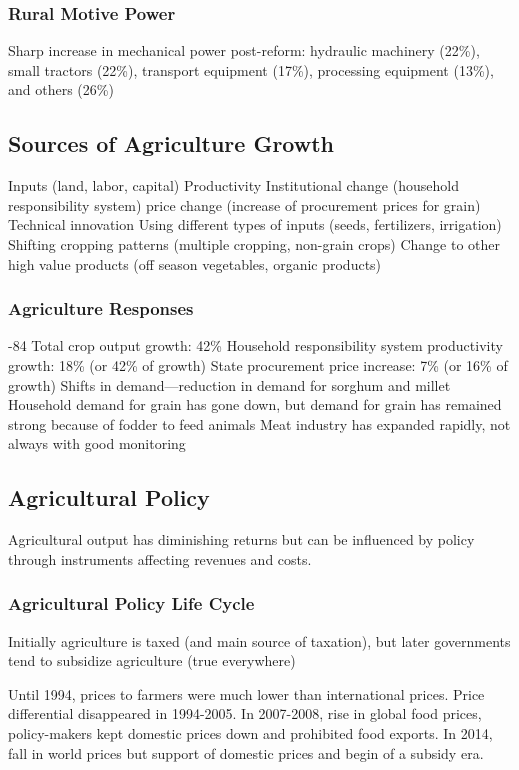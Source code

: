 \documentclass[11pt]{article}
\theoremstyle{definition}
\theoremstyle{remark}
\begin{document}
\subsubsection{Rural Motive Power}
Sharp increase in mechanical power post-reform: hydraulic machinery (22\%), small tractors (22\%), transport equipment (17\%), processing equipment (13\%), and others (26\%)

\subsection{Sources of Agriculture Growth}
\begin{outline}[enumerate]
\1 Inputs (land, labor, capital)
\1 Productivity
	\2 Institutional change (household responsibility system)
	\2 price change (increase of procurement prices for grain)
	\2 Technical innovation
		\3 Using different types of inputs (seeds, fertilizers, irrigation)
		\3 Shifting cropping patterns (multiple cropping, non-grain crops)
		\3 Change to other high value products (off season vegetables, organic products)
\end{outline}

\subsubsection{Agriculture Responses}
\begin{outline}[enumerate]
-84
	\2 Total crop output growth: 42\%
	\2 Household responsibility system productivity growth: 18\% (or 42\% of growth)
	\2 State procurement price increase: 7\% (or 16\% of growth)
\1 Shifts in demand---reduction in demand for sorghum and millet
	\2 Household demand for grain has gone down, but demand for grain has remained strong because of fodder to feed animals
	\2  Meat industry has expanded rapidly, not always with good monitoring
\end{outline}

\subsection{Agricultural Policy}
Agricultural output has diminishing returns but can be influenced by policy through instruments affecting revenues and costs.
\subsubsection{Agricultural Policy Life Cycle}
Initially agriculture is taxed (and main source of taxation), but later governments tend to subsidize agriculture (true everywhere)
\begin{outline}[enumerate]
\1 Until 1994, prices to farmers were much lower than international prices.
\1 Price differential disappeared in 1994-2005. 
\1 In 2007-2008, rise in global food prices, policy-makers kept domestic prices down and prohibited food exports.
\1 In 2014, fall in world prices but support of domestic prices and begin of a subsidy era.
\end{outline}
\end{document}
